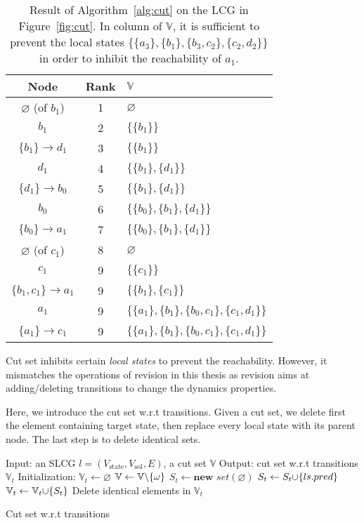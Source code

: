 \begin{table}[ht]
\centering
\begin{tabular}{|c|c|l|}
 \hline 
 Node & Rank & $\mathbb{V}$ \\ 
 \hline 
 $\varnothing$ (of $b_1$) & 1 & $\varnothing$ \\ 
 \hline 
 $b_1$ & 2 & $\{\{b_1\}\}$ \\ 
 \hline 
 $\{b_1\}\to d_1$ & 3 & $\{\{b_1\}\}$ \\ 
 \hline 
 $d_1$ & 4 & $\{\{b_1\},\{d_1\}\}$ \\ 
 \hline 
 $\{d_1\}\to b_0$ & 5 & $\{\{b_1\},\{d_1\}\}$ \\ 
 \hline 
 $b_0$ & 6 & $\{\{b_0\},\{b_1\},\{d_1\}\}$ \\ 
 \hline 
 $\{b_0\}\to a_1$ & 7 & $\{\{b_0\},\{b_1\},\{d_1\}\}$ \\ 
 \hline 
 $\varnothing$ (of $c_1$) & 8 & $\varnothing$ \\ 
 \hline 
 $c_1$ & 9 & $\{\{c_1\}\}$ \\ 
 \hline 
 $\{b_1,c_1\}\to a_1$ & 9 & $\{\{b_1\},\{c_1\}\}$ \\ 
 \hline 
 $a_1$ & 9 & $\{\{a_1\},\{b_1\},\{b_0,c_1\},\{c_1,d_1\}\}$ \\ 
 \hline 
 $\{a_1\}\to c_1$ & 9 & $\{\{a_1\},\{b_1\},\{b_0,c_1\},\{c_1,d_1\}\}$ \\ 
 \hline 
 \end{tabular}
 \caption[Example of cut set]{Result of Algorithm~\ref{alg:cut} on the LCG in Figure~\ref{fig:cut}.
 In column of $\mathbb{V}$, it is sufficient to prevent the local states $\{\{a_3\},\{b_1\},\{b_3,c_2\},\{c_2,d_2\}\}$ in order to inhibit the reachability of $a_1$.}\label{tab:cutset}
\end{table}

Cut set inhibits certain \textit{local states} to prevent the reachability.
However, it mismatches the operations of revision in this thesis as revision aims at adding/deleting transitions to change the dynamics properties.

Here, we introduce the cut set w.r.t transitions.
Given a cut set, we delete first the element containing target state, then replace every local state with its parent node.
The last step is to delete identical sets.

\begin{algorithm}[ht]
\begin{algorithmic}
\State Input: an SLCG $l= (V_{\mathrm{state}},V_{\mathrm{sol}},E)$, a cut set $\mathbb{V}$
\State Output: cut set w.r.t transitions $\mathbb{V}_t$
\State Initialization: $\mathbb{V}_t\gets \varnothing$
        \State $\mathbb{V}\gets \mathbb{V}\miset{\omega}$
    \EndIf
    \State $S_t\gets \textbf{new } set(\varnothing)$
        \State $S_t\gets S_t\addset{ls.pred}$
    \EndFor
    \State $\mathbb{V}_t\gets \mathbb{V}_t\addset{S_t}$
\EndFor
\State Delete identical elements in $\mathbb{V}_t$
\State {}
\end{algorithmic}
\caption{Cut set w.r.t transitions}\label{alg:cutsetTr}
\end{algorithm}

